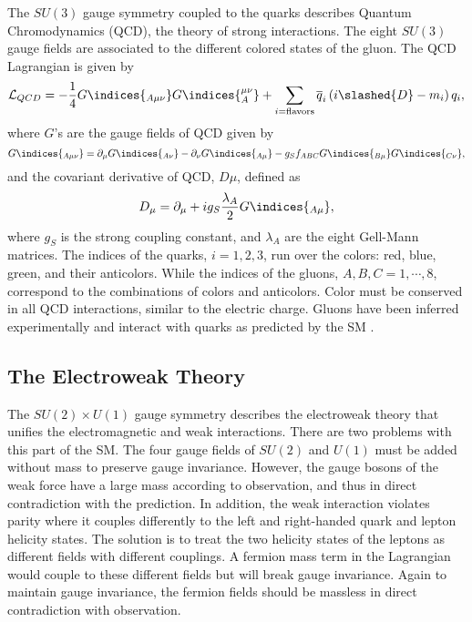 The $ SU\left(3\right) $ gauge symmetry coupled to the quarks describes Quantum Chromodynamics (QCD), the theory of strong interactions.
The eight $ SU\left(3\right) $ gauge fields are associated to the different colored states of the gluon.
The QCD Lagrangian is given by
\begin{equation}
\mathcal{L}_{QCD} = -\frac{1}{4} G\indices{_{A\mu\nu}}G\indices{_{A}^{\mu\nu}} + \sum_{i=\text{flavors}} \overline{q}_i \left(i\slashed{D} - m_i\right) q_i,
\end{equation}
where $G$'s are the gauge fields of QCD given by 
\begin{equation}
G\indices{_{A\mu\nu}} = \partial_{\mu} G\indices{_{A\nu}} - \partial_{\nu} G\indices{_{A\mu}} - g_S f_{ABC} G\indices{_{B\mu}} G\indices{_{C\nu}},
\end{equation}
and the covariant derivative of QCD, $D\mu$,  defined as
\begin{equation}
D_\mu = \partial_{\mu} + i g_S \frac{\lambda_A}{2}G\indices{_{A\mu}},
\end{equation}
where $g_S$ is the strong coupling constant, and $\lambda_A$ are the eight Gell-Mann matrices.
The indices of the quarks, $i=1,2,3$, run over the colors: red, blue, green, and their anticolors.
While the indices of the gluons, $A,B,C = 1, \cdots, 8$, correspond to the combinations of colors and anticolors.
Color must be conserved in all QCD interactions, similar to the  electric charge.
Gluons have been inferred experimentally  and interact with quarks as predicted by the SM \cite{BRANDELIK1979243}.

\subsection{The Electroweak Theory}

The $ SU\left(2\right) \times U\left(1\right) $ gauge symmetry describes the
electroweak theory that unifies the electromagnetic and weak interactions.
There are two problems with this part of the SM.
The four gauge fields of $ SU\left(2\right) $ and $ U\left(1\right) $ 
must be added without mass to preserve gauge invariance.
However, the gauge bosons of the weak force have a large mass according to observation,
and thus in direct contradiction with the prediction.
In addition, the weak interaction violates parity where it couples differently 
to the left and right-handed quark and lepton helicity states.
The solution is to treat the two helicity states of the leptons as different fields
with different couplings. A fermion mass term in the Lagrangian would couple to 
these different fields but will break gauge invariance.
Again to maintain gauge invariance, the fermion fields should be massless in 
direct contradiction with observation.

